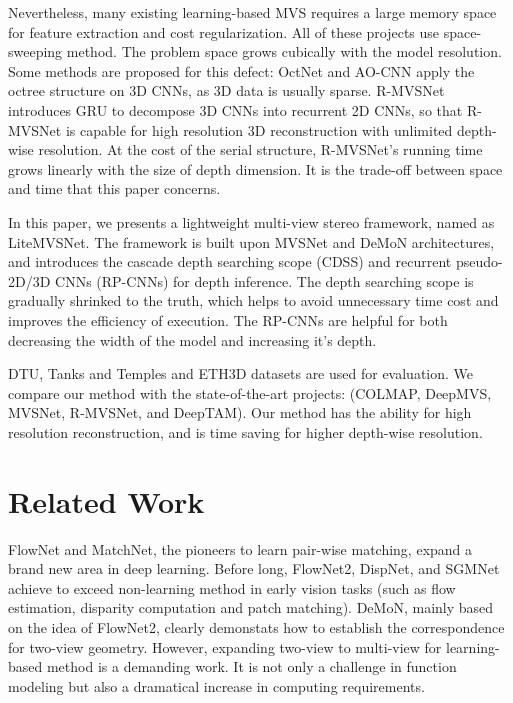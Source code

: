 \documentclass{elegantpaper}
\begin{document}
  Nevertheless, many existing learning-based MVS\cite{DBLP:journals/corr/abs-1804-00650}\cite{DBLP:journals/corr/abs-1804-02505}\cite{DBLP:journals/corr/abs-1901-01535} requires a large memory space for feature extraction and cost regularization. All of these projects use space-sweeping method\cite{517097}. The problem space grows cubically with the model resolution. Some methods are proposed for this defect: OctNet\cite{DBLP:journals/corr/RieglerUG16} and AO-CNN\cite{Wang-2018-AOCNN} apply the octree structure on 3D CNNs, as 3D data is usually sparse. R-MVSNet\cite{DBLP:journals/corr/abs-1902-10556} introduces GRU to decompose 3D CNNs into recurrent 2D CNNs, so that R-MVSNet is capable for high resolution 3D reconstruction with unlimited depth-wise resolution. At the cost of the serial structure, R-MVSNet's running time grows linearly with the size of depth dimension. It is the trade-off between space and time that this paper concerns.

  In this paper, we presents a lightweight multi-view stereo framework, named as LiteMVSNet. The framework is built upon MVSNet \cite{DBLP:journals/corr/abs-1804-02505} and DeMoN\cite{DBLP:journals/corr/UmmenhoferZUMID16} architectures, and introduces the cascade depth searching scope (CDSS) and recurrent pseudo-2D/3D CNNs (RP-CNNs) for depth inference. The depth searching scope is gradually shrinked to the truth, which helps to avoid unnecessary time cost and improves the efficiency of execution. The RP-CNNs are helpful for both decreasing the width of the model and increasing it's depth.

	DTU\cite{jensen2014large}, Tanks and Temples\cite{Knapitsch2017} and ETH3D datasets\cite{schoeps2017cvpr} are used for evaluation. We compare our method with the state-of-the-art projects: (COLMAP, DeepMVS, MVSNet, R-MVSNet, and DeepTAM). Our method has the ability for high resolution reconstruction, and is time saving for higher depth-wise resolution.


\section{Related Work}

 FlowNet\cite{7410673} and MatchNet\cite{7298948}, the pioneers to learn pair-wise matching, expand a brand new area in deep learning. Before long, FlowNet2\cite{DBLP:journals/corr/IlgMSKDB16}, DispNet\cite{MIFDB16}, and SGMNet\cite{MIFDB16} achieve to exceed non-learning method in early vision tasks (such as flow estimation, disparity computation and patch matching). DeMoN\cite{DBLP:journals/corr/UmmenhoferZUMID16}, mainly based on the idea of FlowNet2, clearly demonstats how to establish the correspondence for two-view geometry. However, expanding two-view to multi-view for learning-based method is a demanding work. It is not only a challenge in function modeling but also a dramatical increase in computing requirements.
\end{document}
